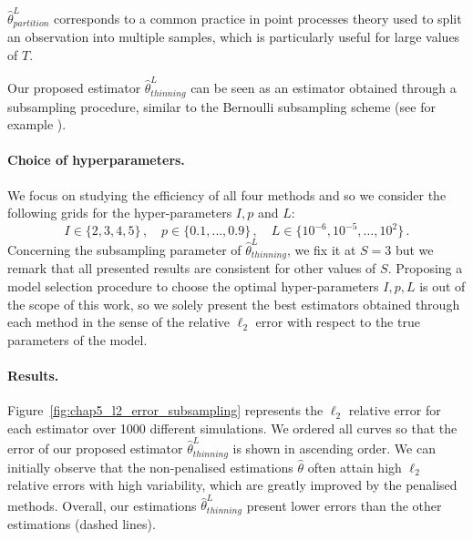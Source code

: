     $\hat \theta^L_{partition}$ corresponds to a common practice in point processes theory used to split an observation into multiple samples, which is particularly useful for large values of $T$.

    Our proposed estimator $\hat \theta^L_{thinning}$ can be seen as an estimator obtained through a subsampling procedure, similar to the Bernoulli subsampling scheme (see for example \textcite[Chapter 3.2]{Sarndal2003}). 
    
    \paragraph{Choice of hyperparameters.} We focus on studying the efficiency of all four methods and so we consider the following grids for the hyper-parameters $I, p$ and $L$:
    \[I\in\{2,3,4,5\}\,,\quad p\in\{0.1, \ldots, 0.9\}\,,\quad L\in\{10^{-6}, 10^{-5}, \ldots, 10^2\}\,.\]
    Concerning the subsampling parameter of $\hat \theta^L_{thinning}$, we fix it at $S=3$ but we remark that all presented results are consistent for other values of $S$.
    Proposing a model selection procedure to choose the optimal hyper-parameters $I, p, L$ is out of the scope of this work, 
    so we solely present the best estimators obtained through each method in the sense of the relative $\ell_2$ error with respect to the true parameters of the model.

    \paragraph{Results.} Figure~\ref{fig:chap5_l2_error_subsampling} represents the $\ell_2$ relative error for each estimator over 1000 different simulations. 
    We ordered all curves so that the error of our proposed estimator $\hat \theta^L_{thinning}$ is shown in ascending order.
    We can initially observe that the non-penalised estimations $\hat \theta$ often attain high $\ell_2$ relative errors with high variability, which are greatly improved by the penalised methods. 
    Overall, our estimations $\hat \theta^L_{thinning}$ present lower errors than the other estimations (dashed lines).
    


